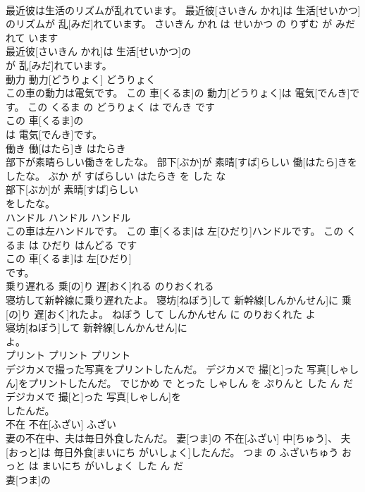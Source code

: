 \documentclass[8pt]{extreport}
\begin{document}
\begin{CJK}{UTF8}{min}
\\	最近彼は生活のリズムが乱れています。	最近彼[さいきん かれ]は 生活[せいかつ]のリズムが 乱[みだ]れています。	さいきん かれ は せいかつ の りずむ が みだれて います	
\\	最近彼[さいきん かれ]は 生活[せいかつ]の
\\	が 乱[みだ]れています。			
\\	動力	動力[どうりょく]	どうりょく	
\\	この車の動力は電気です。	この 車[くるま]の 動力[どうりょく]は 電気[でんき]です。	この くるま の どうりょく は でんき です	
\\	この 車[くるま]の
\\	は 電気[でんき]です。			
\\	働き	働[はたら]き	はたらき	
\\	部下が素晴らしい働きをしたな。	部下[ぶか]が 素晴[すば]らしい 働[はたら]きをしたな。	ぶか が すばらしい はたらき を した な	
\\	部下[ぶか]が 素晴[すば]らしい
\\	をしたな。			
\\	ハンドル	ハンドル	ハンドル	
\\	この車は左ハンドルです。	この 車[くるま]は 左[ひだり]ハンドルです。	この くるま は ひだり はんどる です	
\\	この 車[くるま]は 左[ひだり]
\\	です。			
\\	乗り遅れる	乗[の]り 遅[おく]れる	のりおくれる	
\\	寝坊して新幹線に乗り遅れたよ。	寝坊[ねぼう]して 新幹線[しんかんせん]に 乗[の]り 遅[おく]れたよ。	ねぼう して しんかんせん に のりおくれた よ	
\\	寝坊[ねぼう]して 新幹線[しんかんせん]に
\\	よ。			
\\	プリント	プリント	プリント	
\\	デジカメで撮った写真をプリントしたんだ。	デジカメで 撮[と]った 写真[しゃしん]をプリントしたんだ。	でじかめ で とった しゃしん を ぷりんと した ん だ	
\\	デジカメで 撮[と]った 写真[しゃしん]を
\\	したんだ。			
\\	不在	不在[ふざい]	ふざい	
\\	妻の不在中、夫は毎日外食したんだ。	妻[つま]の 不在[ふざい] 中[ちゅう]、 夫[おっと]は 毎日外食[まいにち がいしょく]したんだ。	つま の ふざいちゅう おっと は まいにち がいしょく した ん だ	
\\	妻[つま]の

\end{CJK}
\end{document}
